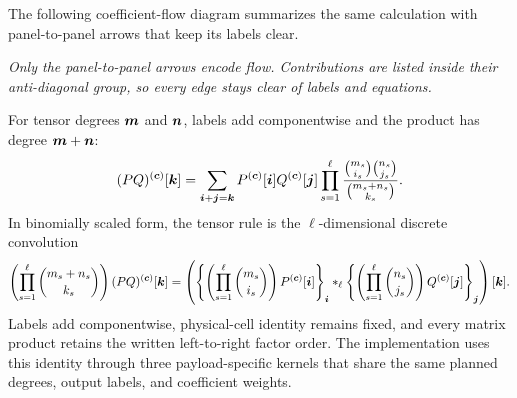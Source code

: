 The following coefficient-flow diagram summarizes the same calculation with panel-to-panel arrows that keep its labels clear.

\begin{center}

\textit{Only the panel-to-panel arrows encode flow. Contributions are listed inside their anti-diagonal group, so every edge stays clear of labels and equations.}
\end{center}

For tensor degrees $\boldsymbol{m}$ and $\boldsymbol{n}$, labels add componentwise and the product has degree $\boldsymbol{m}+\boldsymbol{n}$:
\begin{gather*}
(PQ)^{(\boldsymbol{c})}[\boldsymbol{k}]=
  \sum_{\boldsymbol{i}+\boldsymbol{j}=\boldsymbol{k}}
P^{(\boldsymbol{c})}[\boldsymbol{i}] Q^{(\boldsymbol{c})}[\boldsymbol{j}]
  \prod_{s=1}^{\ell}
  \frac{\binom {m_s}{i_s}\binom {n_s}{j_s}}
       {\binom{m_s+n_s}{k_s}}.
\end{gather*}
In binomially scaled form, the tensor rule is the $\ell$-dimensional discrete convolution
\begin{gather*}
  \left(\prod_{s=1}^{\ell}\binom{m_s+n_s}{k_s}\right)
  (PQ)^{(\boldsymbol{c})}[\boldsymbol{k}]
  =
  \left(
  \left\{\left(\prod_{s=1}^{\ell}\binom {m_s}{i_s}\right)
  P^{(\boldsymbol{c})}[\boldsymbol{i}]\right\}_{\boldsymbol{i}}
  *_{\ell}
  \left\{\left(\prod_{s=1}^{\ell}\binom {n_s}{j_s}\right)
  Q^{(\boldsymbol{c})}[\boldsymbol{j}]\right\}_{\boldsymbol{j}}
  \right)[\boldsymbol{k}].
\end{gather*}
Labels add componentwise, physical-cell identity remains fixed, and every matrix product retains the written left-to-right factor order. The implementation uses this identity through three payload-specific kernels that share the same planned degrees, output labels, and coefficient weights.

